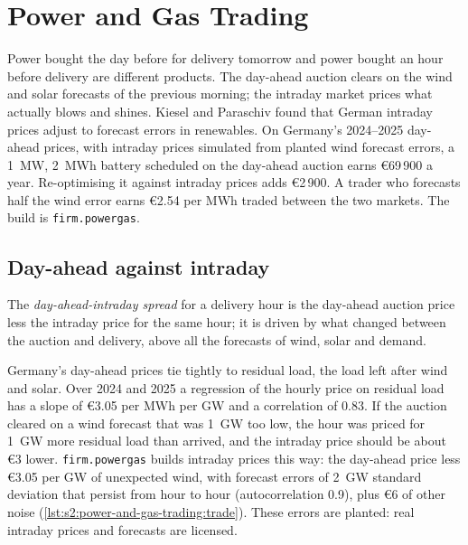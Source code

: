 \chapter{Power and Gas Trading}\label{ch:s2:power-and-gas-trading}

Power bought the day before for delivery tomorrow and power bought an hour before delivery are different products. The day-ahead auction clears on
the wind and solar forecasts of the previous morning; the intraday market prices what actually blows and shines. Kiesel and Paraschiv found that German
intraday prices adjust to forecast errors in renewables. On Germany's 2024--2025 day-ahead prices, with intraday prices simulated from planted wind
forecast errors, a 1~MW, 2~MWh battery scheduled on the day-ahead auction earns \euro69\,900 a year. Re-optimising it against intraday prices adds
\euro2\,900. A trader who forecasts half the wind error earns \euro2.54 per MWh traded between the two markets. The build is \texttt{firm.powergas}.

\section{Day-ahead against intraday}

\begin{definition}\label{def:s2:power-and-gas-trading:daid}
The \emph{day-ahead-intraday spread} for a delivery hour is the day-ahead auction price less the intraday price for
the same hour; it is driven by what changed between the auction and delivery, above all the forecasts of wind, solar and demand.
\end{definition}

Germany's day-ahead prices tie tightly to residual load, the load left after wind and solar. Over 2024 and 2025 a regression of the hourly price on
residual load has a slope of \euro3.05 per MWh per GW and a correlation of 0.83. If the auction cleared on a wind forecast that was 1~GW too low, the
hour was priced for 1~GW more residual load than arrived, and the intraday price should be about \euro3 lower. \texttt{firm.powergas} builds intraday
prices this way: the day-ahead price less \euro3.05 per GW of unexpected wind, with forecast errors of 2~GW standard deviation that persist from hour to
hour (autocorrelation 0.9), plus \euro6 of other noise (\cref{lst:s2:power-and-gas-trading:trade}). These errors are planted: real intraday prices and
forecasts are licensed.

